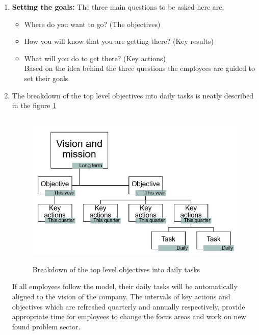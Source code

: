 \begin{enumerate}
    \item \textbf{Setting the goals:} The three main questions to be asked here are.\\

        \begin{itemize}
            \item Where do you want to go? (The objectives)
            \item How you will know that you are getting there? (Key results)
            \item What will you do to get there? (Key actions)\\
Based on the idea behind the three questions the employees are guided to set their goals.\\
        \end{itemize}
        
    \item The breakdown of the top level objectives into daily tasks is neatly described in the figure \ref{fig:4.3}\\

    \begin{figure}[H]
    \centering
    \captionsetup{justification=centering, margin=2cm}
    \vspace{1cm}
    \includegraphics[width=12cm, height=7.5cm]{figure/auxiliary/fig43.PNG}
    \caption{Breakdown of the top level objectives into daily tasks}
    \label{fig:4.3}
    \end{figure}


    If all employees follow the model, their daily tasks will be automatically aligned to the vision of the company. The intervals of key actions and objectives which are refreshed quarterly and annually respectively, provide appropriate time for employees to change the focus areas and work on new found problem sector.\\


\end{enumerate}
